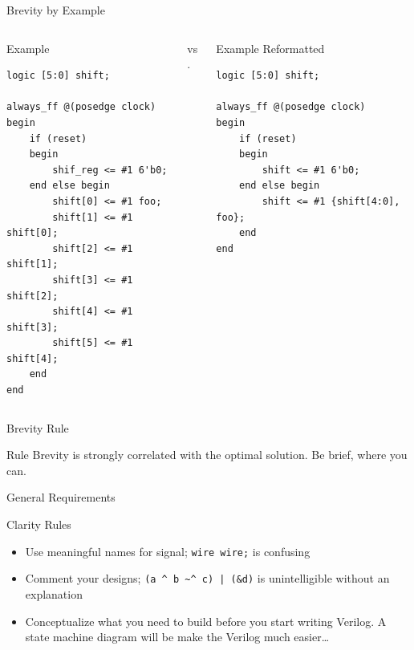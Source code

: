 \documentclass[dvipsnames]{beamer}
\begin{document}
\begin{frame}[fragile]{Brevity by Example}
\begin{columns}
	\begin{column}[T]{0.45\textwidth}
		\begin{block}{Example}
		\begin{verbatim}
logic [5:0] shift;

always_ff @(posedge clock)
begin
    if (reset)
    begin
        shif_reg <= #1 6'b0;
    end else begin
        shift[0] <= #1 foo;
        shift[1] <= #1 shift[0];
        shift[2] <= #1 shift[1];
        shift[3] <= #1 shift[2];
        shift[4] <= #1 shift[3];
        shift[5] <= #1 shift[4];
    end
end
		\end{verbatim}
		\end{block}
	\end{column}
	\pause
	\hspace*{-24pt}
	\begin{column}[T]{0.05\textwidth}
		\vspace*{0.25\textheight}
		\large{vs.}
		\normalsize
	\end{column}
	\begin{column}[T]{0.475\textwidth}
		\begin{block}{Example Reformatted}
		\begin{verbatim}
logic [5:0] shift;

always_ff @(posedge clock)
begin
    if (reset) 
    begin
        shift <= #1 6'b0;
    end else begin
        shift <= #1 {shift[4:0], foo};
    end
end
		\end{verbatim}
		\end{block}
	\end{column}
\end{columns}
\end{frame}

\begin{frame}{Brevity Rule}
	\begin{block}{Rule}
		Brevity is strongly correlated with the optimal solution. Be brief,
		where you can.	
	\end{block}
\end{frame}

\begin{frame}{General Requirements}
	\begin{block}{Clarity Rules}
		\begin{itemize}
			\item Use meaningful names for signal; \texttt{wire wire;} is
				confusing
			\item Comment your designs; \texttt{(a \^{} b \~{}\^{} c) | (\&d)}
				is unintelligible without an explanation
			\item Conceptualize what you need to build before you start writing
				Verilog. A state machine diagram will be make the Verilog much
				easier\dots
		\end{itemize}
	\end{block}
\end{frame}
\end{document}
